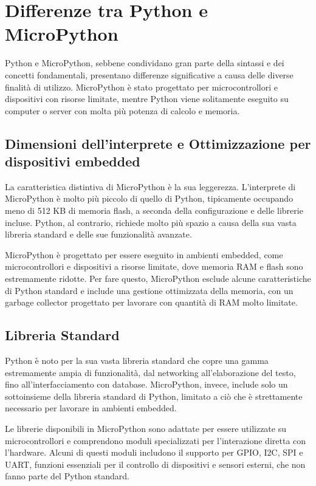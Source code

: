 \documentclass[12pt,a4paper]{report}
\begin{document}
\section{Differenze tra Python e MicroPython}

Python e MicroPython, sebbene condividano gran parte della sintassi e dei concetti fondamentali, presentano differenze significative a causa delle diverse finalità di utilizzo. MicroPython è stato progettato per microcontrollori e dispositivi con risorse limitate, mentre Python viene solitamente eseguito su computer o server con molta più potenza di calcolo e memoria.

\subsection{Dimensioni dell'interprete e Ottimizzazione per dispositivi embedded}

La caratteristica distintiva di MicroPython è la sua leggerezza. L'interprete di MicroPython è molto più piccolo di quello di Python, tipicamente occupando meno di 512 KB di memoria flash, a seconda della configurazione e delle librerie incluse. Python, al contrario, richiede molto più spazio a causa della sua vasta libreria standard e delle sue funzionalità avanzate.

MicroPython è progettato per essere eseguito in ambienti embedded, come microcontrollori e dispositivi a risorse limitate, dove memoria RAM e flash sono estremamente ridotte. Per fare questo, MicroPython esclude alcune caratteristiche di Python standard e include una gestione ottimizzata della memoria, con un garbage collector progettato per lavorare con quantità di RAM molto limitate.

\subsection{Libreria Standard}

Python è noto per la sua vasta libreria standard che copre una gamma estremamente ampia di funzionalità, dal networking all'elaborazione del testo, fino all'interfacciamento con database. MicroPython, invece, include solo un sottoinsieme della libreria standard di Python, limitato a ciò che è strettamente necessario per lavorare in ambienti embedded.

Le librerie disponibili in MicroPython sono adattate per essere utilizzate su microcontrollori e comprendono moduli specializzati per l'interazione diretta con l'hardware. Alcuni di questi moduli includono il supporto per GPIO, I2C, SPI e UART, funzioni essenziali per il controllo di dispositivi e sensori esterni, che non fanno parte del Python standard.
\end{document}
